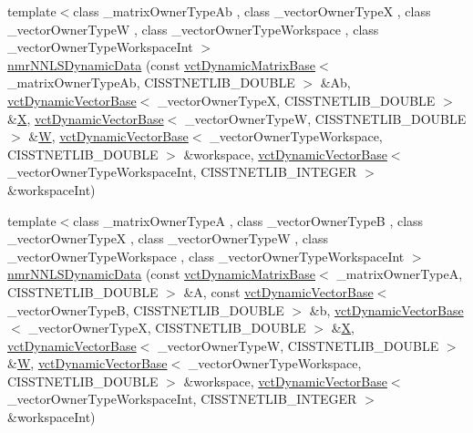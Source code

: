 {\bf }\par
\begin{DoxyCompactItemize}
\item 
{\footnotesize template$<$class \+\_\+matrix\+Owner\+Type\+Ab , class \+\_\+vector\+Owner\+Type\+X , class \+\_\+vector\+Owner\+Type\+W , class \+\_\+vector\+Owner\+Type\+Workspace , class \+\_\+vector\+Owner\+Type\+Workspace\+Int $>$ }\\\hyperlink{classnmr_n_n_l_s_dynamic_data_ab690598d21ef11158587d4aeac609bd5}{nmr\+N\+N\+L\+S\+Dynamic\+Data} (const \hyperlink{classvct_dynamic_matrix_base}{vct\+Dynamic\+Matrix\+Base}$<$ \+\_\+matrix\+Owner\+Type\+Ab, C\+I\+S\+S\+T\+N\+E\+T\+L\+I\+B\+\_\+\+D\+O\+U\+B\+L\+E $>$ \&Ab, \hyperlink{classvct_dynamic_vector_base}{vct\+Dynamic\+Vector\+Base}$<$ \+\_\+vector\+Owner\+Type\+X, C\+I\+S\+S\+T\+N\+E\+T\+L\+I\+B\+\_\+\+D\+O\+U\+B\+L\+E $>$ \&\hyperlink{classnmr_n_n_l_s_dynamic_data_a2c67d4c5f9eff20ae015e60f85718f02}{X}, \hyperlink{classvct_dynamic_vector_base}{vct\+Dynamic\+Vector\+Base}$<$ \+\_\+vector\+Owner\+Type\+W, C\+I\+S\+S\+T\+N\+E\+T\+L\+I\+B\+\_\+\+D\+O\+U\+B\+L\+E $>$ \&\hyperlink{classnmr_n_n_l_s_dynamic_data_ae3204dc027313115b092088253dc4bb0}{W}, \hyperlink{classvct_dynamic_vector_base}{vct\+Dynamic\+Vector\+Base}$<$ \+\_\+vector\+Owner\+Type\+Workspace, C\+I\+S\+S\+T\+N\+E\+T\+L\+I\+B\+\_\+\+D\+O\+U\+B\+L\+E $>$ \&workspace, \hyperlink{classvct_dynamic_vector_base}{vct\+Dynamic\+Vector\+Base}$<$ \+\_\+vector\+Owner\+Type\+Workspace\+Int, C\+I\+S\+S\+T\+N\+E\+T\+L\+I\+B\+\_\+\+I\+N\+T\+E\+G\+E\+R $>$ \&workspace\+Int)
\item 
{\footnotesize template$<$class \+\_\+matrix\+Owner\+Type\+A , class \+\_\+vector\+Owner\+Type\+B , class \+\_\+vector\+Owner\+Type\+X , class \+\_\+vector\+Owner\+Type\+W , class \+\_\+vector\+Owner\+Type\+Workspace , class \+\_\+vector\+Owner\+Type\+Workspace\+Int $>$ }\\\hyperlink{classnmr_n_n_l_s_dynamic_data_afb70abf940637543bccb9911440286c0}{nmr\+N\+N\+L\+S\+Dynamic\+Data} (const \hyperlink{classvct_dynamic_matrix_base}{vct\+Dynamic\+Matrix\+Base}$<$ \+\_\+matrix\+Owner\+Type\+A, C\+I\+S\+S\+T\+N\+E\+T\+L\+I\+B\+\_\+\+D\+O\+U\+B\+L\+E $>$ \&A, const \hyperlink{classvct_dynamic_vector_base}{vct\+Dynamic\+Vector\+Base}$<$ \+\_\+vector\+Owner\+Type\+B, C\+I\+S\+S\+T\+N\+E\+T\+L\+I\+B\+\_\+\+D\+O\+U\+B\+L\+E $>$ \&b, \hyperlink{classvct_dynamic_vector_base}{vct\+Dynamic\+Vector\+Base}$<$ \+\_\+vector\+Owner\+Type\+X, C\+I\+S\+S\+T\+N\+E\+T\+L\+I\+B\+\_\+\+D\+O\+U\+B\+L\+E $>$ \&\hyperlink{classnmr_n_n_l_s_dynamic_data_a2c67d4c5f9eff20ae015e60f85718f02}{X}, \hyperlink{classvct_dynamic_vector_base}{vct\+Dynamic\+Vector\+Base}$<$ \+\_\+vector\+Owner\+Type\+W, C\+I\+S\+S\+T\+N\+E\+T\+L\+I\+B\+\_\+\+D\+O\+U\+B\+L\+E $>$ \&\hyperlink{classnmr_n_n_l_s_dynamic_data_ae3204dc027313115b092088253dc4bb0}{W}, \hyperlink{classvct_dynamic_vector_base}{vct\+Dynamic\+Vector\+Base}$<$ \+\_\+vector\+Owner\+Type\+Workspace, C\+I\+S\+S\+T\+N\+E\+T\+L\+I\+B\+\_\+\+D\+O\+U\+B\+L\+E $>$ \&workspace, \hyperlink{classvct_dynamic_vector_base}{vct\+Dynamic\+Vector\+Base}$<$ \+\_\+vector\+Owner\+Type\+Workspace\+Int, C\+I\+S\+S\+T\+N\+E\+T\+L\+I\+B\+\_\+\+I\+N\+T\+E\+G\+E\+R $>$ \&workspace\+Int)
\end{DoxyCompactItemize}


